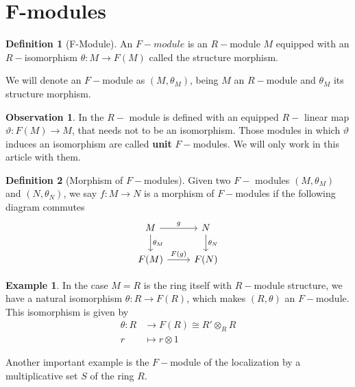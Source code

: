 \documentclass[leqno]{article}
\theoremstyle{definition}
\newtheorem{definition}{Definition}[section]
\newtheorem{observation}{Observation}[section]
\newtheorem{example}{Example}[section]
\begin{document}
\section{F-modules}

\begin{definition}[F-Module] An $F-module$ is an $R-$module $M$ equipped with an $R-$isomorphism  $\theta:M \to F(M)$ called the structure morphism.
\end{definition}

We will denote an $F-$module as  $(M, \theta_M)$, being $M$ an  $R-$module and  $\theta _M$ its structure morphism.

\begin{observation} In \cite{blickle} the $R-$ module is defined with an equipped $R-$ linear map $\vartheta : F(M)\to M$, that needs not to be an isomorphism. Those modules in which $\vartheta$ induces an isomorphism are called \textbf{unit} $F-$modules. We will only work in this article with them.
\end{observation}

\begin{definition}[Morphism of $F-$modules] Given two  $F-$ modules  $(M, \theta _M)$ and $(N, \theta _N)$, we say $f:M\to N$ is a morphism of $F-$modules if the following diagram commutes
\[\begin{tikzcd}
	M & N \\
	{F(M)} & {F(N)}
	\arrow["{\theta_M}", from=1-1, to=2-1]
	\arrow["{\theta_N}", from=1-2, to=2-2]
	\arrow["g", from=1-1, to=1-2]
	\arrow["{F(g)}", from=2-1, to=2-2]
\end{tikzcd}\]
\end{definition}

\begin{example} In the case $M=R$ is the ring itself with  $R-$module structure, we have a natural isomorphism  $\theta : R \to F(R)$, which makes $(R, \theta )$ an $F-$module. This isomorphism is given by
  \begin{align*}
	\theta : R &\to F(R)\cong R' \otimes _R R \\
	r &\mapsto r \otimes 1
  \end{align*}

\end{example}

Another important example is the $F-$module of the localization by a multiplicative set $S$ of the ring $R$.
\end{document}
